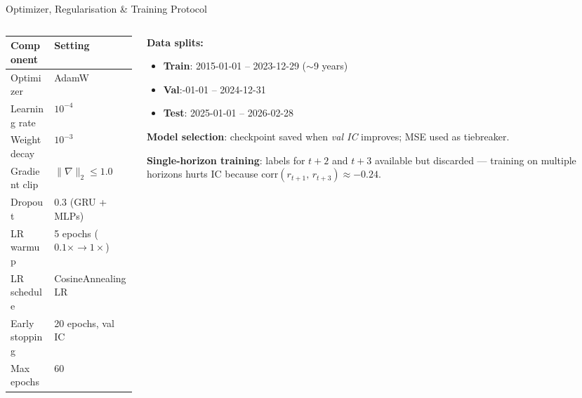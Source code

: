 \documentclass[aspectratio=169, 10pt]{beamer}
\begin{document}
\begin{frame}{Optimizer, Regularisation \& Training Protocol}
  \begin{columns}[T]
    \begin{column}{0.48\textwidth}
      \begin{center}
      \renewcommand{\arraystretch}{1.3}
      \begin{tabular}{ll}
        \toprule
        \textbf{Component} & \textbf{Setting} \\
        \midrule
        Optimizer & AdamW \\
        Learning rate & $10^{-4}$ \\
        Weight decay & $10^{-3}$ \\
        Gradient clip & $\|\nabla\|_2 \leq 1.0$ \\
        Dropout & $0.3$ (GRU + MLPs) \\
        \midrule
        LR warmup & 5 epochs ($0.1\times \to 1\times$) \\
        LR schedule & CosineAnnealingLR \\
        Early stopping & 20 epochs, val IC \\
        Max epochs & 60 \\
        \bottomrule
      \end{tabular}
      \end{center}
    \end{column}
    \begin{column}{0.48\textwidth}
      \textbf{Data splits:}
      \begin{itemize}
        \item \textbf{Train}: 2015-01-01 -- 2023-12-29 ($\sim$9 years)
        \item \textbf{Val}:-01-01 -- 2024-12-31
        \item \textbf{Test}: 2025-01-01 -- 2026-02-28
      \end{itemize}

      \bigskip
      \textbf{Model selection}: checkpoint saved when \emph{val IC} improves;
      MSE used as tiebreaker.

      \bigskip
      \textbf{Single-horizon training}: labels for $t{+}2$ and $t{+}3$
      available but discarded — training on multiple horizons hurts IC
      because $\text{corr}(r_{t+1},\, r_{t+3}) \approx -0.24$.
    \end{column}
  \end{columns}
\end{frame}
\end{document}
